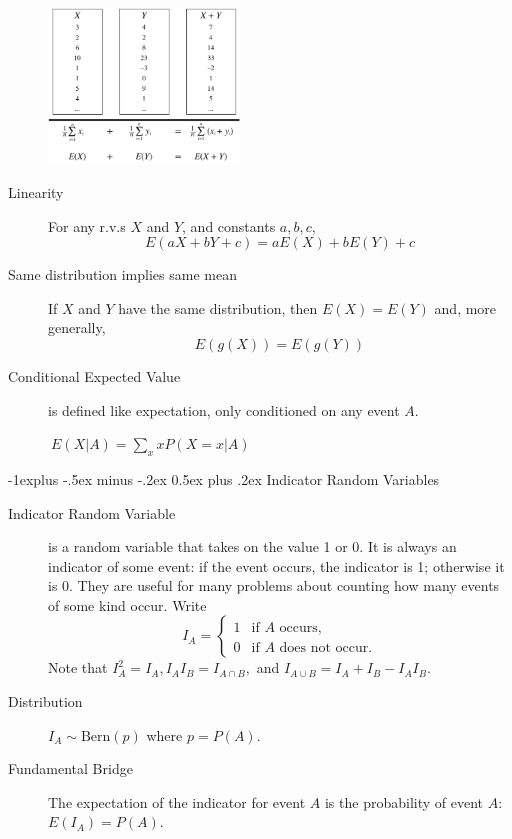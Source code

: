 \documentclass[6pt, landscape]{article}
\makeatletter
\renewcommand{\subsection}{\@startsection{subsection}{2}{0mm}%
                                {-1explus -.5ex minus -.2ex}%
                                {0.5ex plus .2ex}%
                                {\small\bfseries}}
\newcommand{\Bern}{\textrm{Bern}}
\makeatother
\begin{document}
\begin{multicols}{3}
\begin{description}
                      \begin{minipage}{\linewidth}
                              \centering
                              \includegraphics[width=2in]{figures/linearity.pdf}
                      \end{minipage}


                \item[Linearity] For any r.v.s $X$ and $Y$, and constants $a,b,c,$
                      \[E(aX + bY + c) = aE(X) + bE(Y) + c \]

                \item[Same distribution implies same mean] If $X$ and $Y$ have the same distribution, then $E(X)=E(Y)$ and, more generally,
                      $$E(g(X)) = E(g(Y))$$


                \item[Conditional Expected Value] is defined like expectation, only conditioned on any event $A$. \begin{center}
                              $\ E(X | A) = \sum\limits_{x}xP(X=x | A)$
                      \end{center}

        \end{description}

        \subsection{Indicator Random Variables}
        \begin{description}
                \item[Indicator Random Variable] is a random variable that takes on the value 1 or 0. It is always an indicator of some event: if the event occurs, the indicator is 1; otherwise it is 0. They are useful for many problems about counting how many events of some kind occur. Write \[
                              I_A =
                              \begin{cases}
                                      1 & \text{if $A$ occurs,}         \\
                                      0 & \text{if $A$ does not occur.}
                              \end{cases}
                      \]
                      Note that $I_A^2 = I_A, I_A I_B = I_{A \cap B}, $ and $I_{A \cup B} = I_A + I_B - I_A I_B$.
                \item[Distribution] $I_A \sim \Bern(p)$ where $p = P(A)$.
                \item[Fundamental Bridge] The expectation of the indicator for event $A$ is the probability of event $A$: $E(I_A) = P(A)$.
        \end{description}


\end{multicols}
\end{document}
